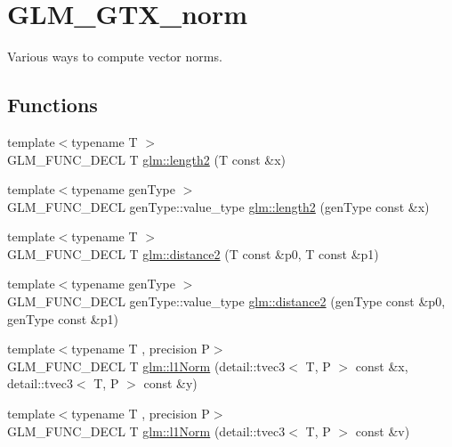 \hypertarget{group__gtx__norm}{\section{G\-L\-M\-\_\-\-G\-T\-X\-\_\-norm}
\label{group__gtx__norm}
}


Various ways to compute vector norms.  


\subsection*{Functions}
\begin{DoxyCompactItemize}
\item 
{\footnotesize template$<$typename T $>$ }\\G\-L\-M\-\_\-\-F\-U\-N\-C\-\_\-\-D\-E\-C\-L T \hyperlink{group__gtx__norm_ga08c670024cd230e22f8b853f185ff533}{glm\-::length2} (T const \&x)
\item 
{\footnotesize template$<$typename gen\-Type $>$ }\\G\-L\-M\-\_\-\-F\-U\-N\-C\-\_\-\-D\-E\-C\-L gen\-Type\-::value\-\_\-type \hyperlink{group__gtx__norm_gaa279ba7fdecbed3f9f2b60502b7ec8ca}{glm\-::length2} (gen\-Type const \&x)
\item 
{\footnotesize template$<$typename T $>$ }\\G\-L\-M\-\_\-\-F\-U\-N\-C\-\_\-\-D\-E\-C\-L T \hyperlink{group__gtx__norm_ga3544f6288d3bce2cf2a9f6ebe39e0557}{glm\-::distance2} (T const \&p0, T const \&p1)
\item 
{\footnotesize template$<$typename gen\-Type $>$ }\\G\-L\-M\-\_\-\-F\-U\-N\-C\-\_\-\-D\-E\-C\-L gen\-Type\-::value\-\_\-type \hyperlink{group__gtx__norm_gaec2d9df62436879b48207d39516f3788}{glm\-::distance2} (gen\-Type const \&p0, gen\-Type const \&p1)
\item 
{\footnotesize template$<$typename T , precision P$>$ }\\G\-L\-M\-\_\-\-F\-U\-N\-C\-\_\-\-D\-E\-C\-L T \hyperlink{group__gtx__norm_gae7c48d18df3e4a9c13bb9c003e434d5f}{glm\-::l1\-Norm} (detail\-::tvec3$<$ T, P $>$ const \&x, detail\-::tvec3$<$ T, P $>$ const \&y)
\item 
{\footnotesize template$<$typename T , precision P$>$ }\\G\-L\-M\-\_\-\-F\-U\-N\-C\-\_\-\-D\-E\-C\-L T \hyperlink{group__gtx__norm_ga466d01e7b4350f44250d80ec48128fbd}{glm\-::l1\-Norm} (detail\-::tvec3$<$ T, P $>$ const \&v)
\item 

\end{DoxyCompactItemize}
